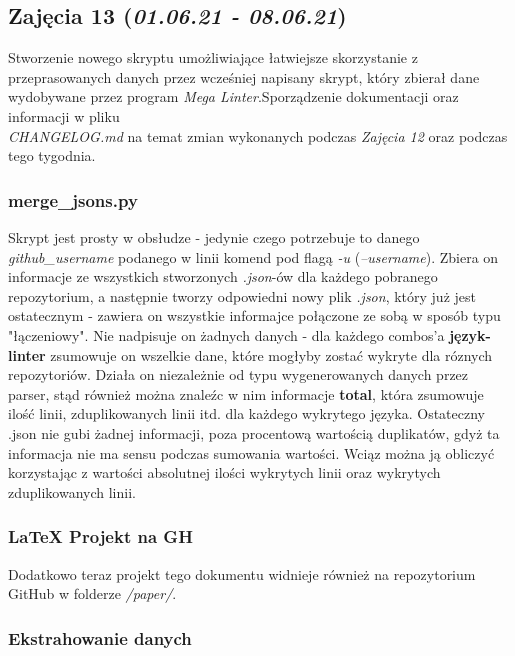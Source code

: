 \documentclass[graybox]{svmult}
\begin{document}
\subsection{Zajęcia 13 (\emph{01.06.21 - 08.06.21})}

Stworzenie nowego skryptu umożliwiające łatwiejsze skorzystanie z przeprasowanych danych przez wcześniej napisany skrypt, który zbierał dane wydobywane przez program \emph{Mega Linter}.Sporządzenie dokumentacji oraz informacji w pliku \\ \emph{CHANGELOG.md} na temat zmian wykonanych podczas \emph{Zajęcia 12} oraz podczas tego tygodnia. 

\subsubsection{merge\_jsons.py}

Skrypt jest prosty w obsłudze - jedynie czego potrzebuje to danego \emph{github\_username} podanego w linii komend pod flagą \emph{-u} (\emph{--username}). Zbiera on informacje ze wszystkich stworzonych \emph{.json}-ów dla każdego pobranego repozytorium, a następnie tworzy odpowiedni nowy plik \emph{.json}, który już jest ostatecznym - zawiera on wszystkie informajce połączone ze sobą w sposób typu "łączeniowy". Nie nadpisuje on żadnych danych - dla każdego combos'a \textbf{język-linter} zsumowuje on wszelkie dane, które mogłyby zostać wykryte dla róznych repozytoriów. Działa on niezależnie od typu wygenerowanych danych przez parser, stąd również można znaleźc w nim informacje \textbf{total}, która zsumowuje ilość linii, zduplikowanych linii itd. dla każdego wykrytego języka. Ostateczny .json nie gubi żadnej informacji, poza procentową wartością duplikatów, gdyż ta informacja nie ma sensu podczas sumowania wartości. Wciąz można ją obliczyć korzystając z wartości absolutnej ilości wykrytych linii oraz wykrytych zduplikowanych linii.

\subsubsection{LaTeX Projekt na GH}

Dodatkowo teraz projekt tego dokumentu widnieje również na repozytorium GitHub w folderze \emph{/paper/}. 

\subsubsection{Ekstrahowanie danych}
\end{document}
